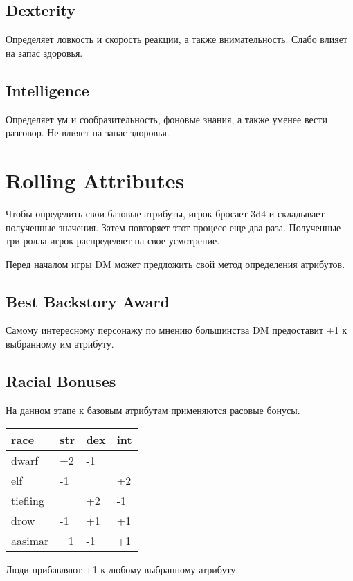 \documentclass[a5paper,11pt]{book}
\begin{document}
\begin{multicols}{2}
\subsection{Dexterity}
Определяет ловкость и скорость реакции, а также внимательность. Слабо влияет на запас здоровья.

\subsection{Intelligence}
Определяет ум и сообразительность, фоновые знания, а также уменее вести разговор. Не влияет на запас здоровья.

\section{Rolling Attributes}
Чтобы определить свои базовые атрибуты, игрок бросает 3d4 и складывает полученные значения. Затем повторяет этот процесс еще два раза. Полученные три ролла игрок распределяет на свое усмотрение.

Перед началом игры DM может предложить свой метод определения атрибутов.

\subsection{Best Backstory Award}
Самому интересному персонажу по мнению большинства DM предоставит +1 к выбранному им атрибуту.

\subsection{Racial Bonuses}
На данном этапе к базовым атрибутам применяются расовые бонусы.

\smallskip
\noindent
{}
\setlength\tabcolsep{0pt}
\begin{tabularx}{\linewidth}{@{}ZYYY@{}}
  \textbf{race} & \textbf{str} & \textbf{dex} & \textbf{int} \\
  \hline
  dwarf     & +2 & -1 &    \\
  elf       & -1 &    & +2 \\
  tiefling  &    & +2 & -1 \\
  drow      & -1 & +1 & +1 \\
  aasimar   & +1 & -1 & +1
\end{tabularx}
\smallskip

Люди прибавляют +1 к любому выбранному атрибуту.


\end{multicols}
\end{document}
